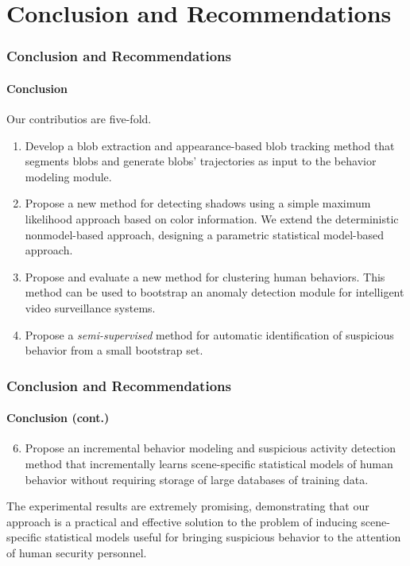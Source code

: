 
\section{Conclusion and Recommendations}

\begin{frame}
    \frametitle{Conclusion and Recommendations}
    \framesubtitle{Conclusion}

    Our contributios are five-fold.
    \begin{enumerate}
        \item Develop a blob extraction and appearance-based 
            blob tracking method that segments blobs and generate 
            blobs' trajectories as input to the behavior modeling module.
        \item Propose a new method for detecting shadows using a 
            simple maximum likelihood approach based on color information. 
            We extend the deterministic nonmodel-based approach, designing 
            a parametric statistical model-based approach.
        \item Propose and evaluate a new method for clustering human 
            behaviors. This method can be used to bootstrap an anomaly 
            detection module for intelligent video surveillance systems. 
        \item Propose a \textit{semi-supervised} method for automatic 
            identification of suspicious behavior from a small bootstrap 
            set.
    \end{enumerate}

\end{frame}


\begin{frame}
    \frametitle{Conclusion and Recommendations}
    \framesubtitle{Conclusion (cont.)}

    \begin{enumerate}
        \setcounter{enumi}{5}
        \item Propose an incremental behavior modeling and suspicious 
            activity detection method that incrementally learns scene-specific 
            statistical models of human behavior without requiring storage of 
            large databases of training data. 
    \end{enumerate}

    \medskip

    The experimental results are extremely promising, demonstrating that our 
    approach is a practical and effective solution to the problem of inducing 
    scene-specific statistical models useful for bringing suspicious behavior 
    to the attention of human security personnel.

\end{frame}

